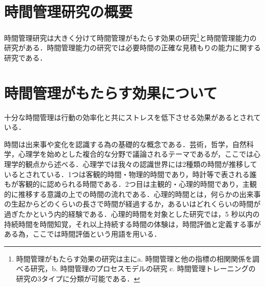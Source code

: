 \section{時間管理研究の概要}
時間管理研究は大きく分けて時間管理がもたらす効果の研究\footnote{時間管理がもたらす効果の研究は主にa. 時間管理と他の指標の相関関係を調べる研究，b. 時間管理のプロセスモデルの研究 c. 時間管理トレーニングの研究の3タイプに分類が可能である．}と時間管理能力の研究がある．時間管理能力の研究では必要時間の正確な見積もりの能力に関する研究である．




\section{時間管理がもたらす効果について}
十分な時間管理は行動の効率化と共にストレスを低下させる効果があるとされている．

時間は出来事や変化を認識する為の基礎的な概念である．芸術，哲学，自然科学，心理学を始めとした複合的な分野で議論されるテーマであるが，ここでは心理学的観点から述べる．心理学では我々の認識世界には2種類の時間が推移しているとされている．1つは客観的時間・物理的時間であり，時計等で表される誰もが客観的に認められる時間である．2つ目は主観的・心理的時間であり，主観的に推移する意識の上での時間の流れである．心理的時間とは，何らかの出来事の生起からどのくらいの長さで時間が経過するか，あるいはどれくらいの時間が過ぎたかという内的経験である\cite{Meck2005}．心理的時間を対象とした研究では，5 秒以内の持続時間を時間知覚，それ以上持続する時間の体験は，時間評価と定義する事がある為\cite{Kato2005}，ここでは時間評価という用語を用いる．

